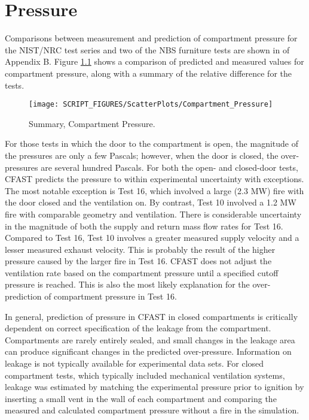 \chapter{Pressure}

Comparisons between measurement and prediction of compartment pressure for the NIST/NRC test series and two of the NBS furniture tests are shown in of Appendix B.  Figure \ref{fig:Pressure_Scatter} shows a comparison of predicted and measured values for compartment pressure, along with a summary of the relative difference for the tests.
\label{Compartment Over-Pressure}

\begin{figure}
\begin{center}
\texttt{[image: SCRIPT\_FIGURES/ScatterPlots/Compartment\_Pressure]}  \\
\end{center}
\caption[Summary, Compartment Pressure]{Summary, Compartment Pressure.} \label{fig:Pressure_Scatter}
\end{figure}

For those tests in which the door to the compartment is open, the magnitude of the pressures are only a few Pascals; however, when the door is closed, the over-pressures are several hundred Pascals.  For both the open- and closed-door tests, CFAST predicts the pressure to within experimental uncertainty with exceptions.  The most notable exception is Test 16, which involved a large (2.3 MW) fire with the door closed and the ventilation on.  By contrast, Test 10 involved a 1.2 MW fire with comparable geometry and ventilation.  There is considerable uncertainty in the magnitude of both the supply and return mass flow rates for Test 16.  Compared to Test 16, Test 10 involves a greater measured supply velocity and a lesser measured exhaust velocity.  This is probably the result of the higher pressure caused by the larger fire in Test 16.  CFAST does not adjust the ventilation rate based on the compartment pressure until a specified cutoff pressure is reached.  This is also the most likely explanation for the over-prediction of compartment pressure in Test 16.

In general, prediction of pressure in CFAST in closed compartments is critically dependent on correct specification of the leakage from the compartment.  Compartments are rarely entirely sealed, and small changes in the leakage area can produce significant changes in the predicted over-pressure. Information on leakage is not typically available for experimental data sets. For closed compartment tests, which typically included mechanical ventilation systems, leakage was estimated by matching the experimental pressure prior to ignition by inserting a small vent in the wall of each compartment and comparing the measured and calculated compartment pressure without a fire in the simulation.


